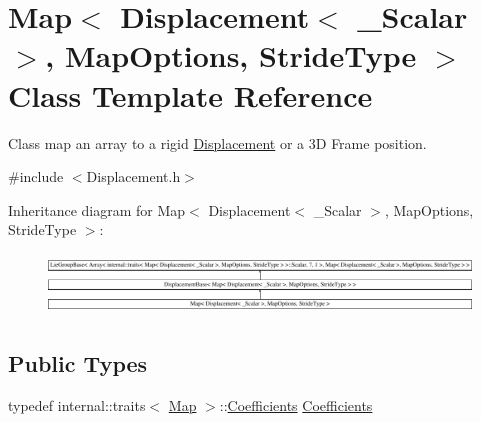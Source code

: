 \hypertarget{class_map_3_01_displacement_3_01___scalar_01_4_00_01_map_options_00_01_stride_type_01_4}{}\section{Map$<$ Displacement$<$ \+\_\+\+Scalar $>$, Map\+Options, Stride\+Type $>$ Class Template Reference}
\label{class_map_3_01_displacement_3_01___scalar_01_4_00_01_map_options_00_01_stride_type_01_4}


Class map an array to a rigid \hyperlink{class_displacement}{Displacement} or a 3D Frame position.  




{\ttfamily \#include $<$Displacement.\+h$>$}

Inheritance diagram for Map$<$ Displacement$<$ \+\_\+\+Scalar $>$, Map\+Options, Stride\+Type $>$\+:\begin{figure}[H]
\begin{center}
\leavevmode
\includegraphics[height=1.612284cm]{class_map_3_01_displacement_3_01___scalar_01_4_00_01_map_options_00_01_stride_type_01_4}
\end{center}
\end{figure}
\subsection*{Public Types}
\begin{DoxyCompactItemize}
\item 
typedef internal\+::traits$<$ \hyperlink{class_map_3_01_displacement_3_01___scalar_01_4_00_01_map_options_00_01_stride_type_01_4_a7355e77dc9b91bd8cb68f20847318f0f}{Map} $>$\+::\hyperlink{class_map_3_01_displacement_3_01___scalar_01_4_00_01_map_options_00_01_stride_type_01_4_a3213feadb99e77889a832a1ef1e80b4b}{Coefficients} \hyperlink{class_map_3_01_displacement_3_01___scalar_01_4_00_01_map_options_00_01_stride_type_01_4_a3213feadb99e77889a832a1ef1e80b4b}{Coefficients}
\end{DoxyCompactItemize}
